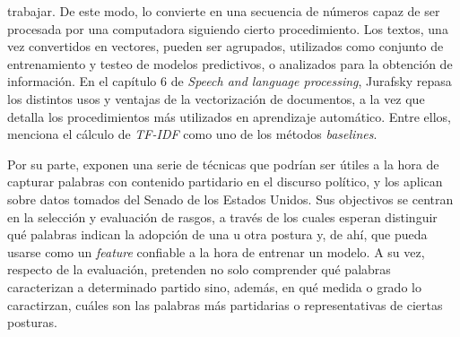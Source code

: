 trabajar.
De este modo, lo convierte en una secuencia de números capaz de ser
procesada por una computadora siguiendo cierto procedimiento.
Los textos, una vez convertidos en vectores, pueden ser agrupados, utilizados
como conjunto de entrenamiento y testeo de modelos predictivos, o analizados para
la obtención de información.
En el capítulo 6 de \textit{Speech and language processing}, Jurafsky
repasa los distintos usos y ventajas de la vectorización de documentos, a la vez
que detalla los procedimientos más utilizados en aprendizaje automático. Entre ellos,
menciona el cálculo de \textit{TF-IDF} como uno de los métodos \textit{baselines}.
\par
Por su parte, \cite{monroe2008fightin} exponen una serie de técnicas
que podrían ser útiles a la hora de capturar palabras con contenido partidario
en el discurso político, y los aplican sobre datos tomados del Senado de los Estados
Unidos. Sus objectivos se centran en la selección y evaluación de rasgos, a través
de los cuales esperan distinguir qué palabras indican la adopción de una u otra postura
y, de ahí, que pueda usarse como un \textit{feature} confiable a la hora de entrenar un
modelo. A su vez, respecto de la evaluación, pretenden no solo comprender qué
palabras caracterizan a determinado partido sino, además, en qué medida o grado
lo caractirzan, cuáles son las palabras más partidarias o representativas de ciertas
posturas.

